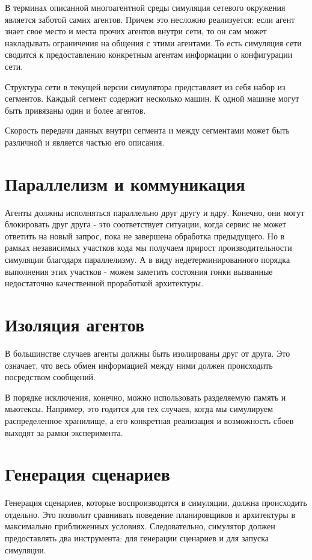 В терминах описанной многоагентной среды симуляция сетевого окружения является заботой самих агентов. Причем это несложно реализуется: если агент знает свое место и места прочих агентов внутри сети, то он сам может накладывать ограничения на общения с этими агентами. То есть симуляция сети сводится к предоставлению конкретным агентам информации о конфигурации сети.

Структура сети в текущей версии симулятора представляет из себя набор из сегментов. Каждый сегмент содержит несколько машин. К одной машине могут быть привязаны один и более агентов.

Скорость передачи данных внутри сегмента и между сегментами может быть различной и является частью его описания.

\section{Параллелизм и коммуникация}

Агенты должны исполняться параллельно друг другу и ядру. Конечно, они могут блокировать друг друга - это соответствует ситуации, когда сервис не может ответить на новый запрос, пока не завершена обработка предыдущего. Но в рамках независимых участков кода мы получаем прирост производительности симуляции благодаря параллелизму. А в виду недетерминированного порядка выполнения этих участков - можем заметить состояния гонки вызванные недостаточно качественной проработкой архитектуры.

\section{Изоляция агентов}

В большинстве случаев агенты должны быть изолированы друг от друга. Это означает, что весь обмен информацией между ними должен происходить посредством сообщений.

В порядке исключения, конечно, можно использовать разделяемую память и мьютексы. Например, это годится для тех случаев, когда мы симулируем распределенное хранилище, а его конкретная реализация и возможность сбоев выходят за рамки эксперимента.

\section{Генерация сценариев}

Генерация сценариев, которые воспроизводятся в симуляции, должна происходить отдельно. Это позволит сравнивать поведение планировщиков и архитектуры в максимально приближенных условиях. Следовательно, симулятор должен предоставлять два инструмента: для генерации сценариев и для запуска симуляции.

